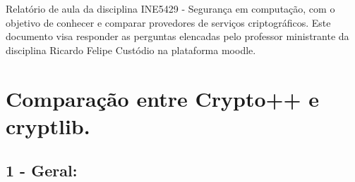 \documentclass[
    article,            %
    11pt,               %
    oneside,            %
    a4paper,            %
    english,            %
    brazil,             %
    sumario=tradicional,
    ]{abntex2}
\begin{document}

\frenchspacing 


%
%

\maketitle


\begin{resumoumacoluna}
    Relatório de aula da disciplina INE5429 - Segurança em computação, com o objetivo de conhecer e comparar provedores de serviços criptográficos. Este documento visa responder as perguntas elencadas pelo professor ministrante da disciplina Ricardo Felipe Custódio na plataforma moodle.
 
 \vspace{\onelineskip}
 
\end{resumoumacoluna}


\textual


\section*{\textbf{Comparação entre Crypto++ e cryptlib.}}

\subsection*{\textbf{1 - Geral:}}
\end{document}
